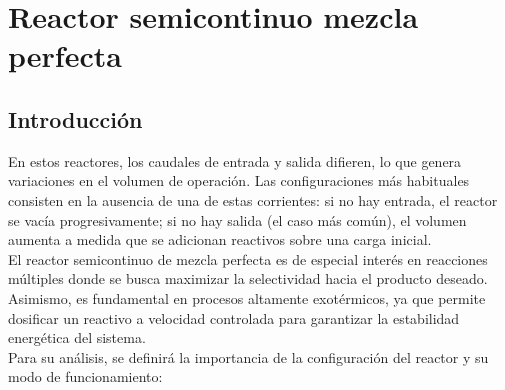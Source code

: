 \chapter{Reactor semicontinuo mezcla perfecta}
\section{Introducción}
\begin{flushleft}
  En estos reactores, los caudales de entrada y salida difieren, lo que genera variaciones en el volumen de operación. Las configuraciones más habituales consisten en la ausencia de una de estas corrientes: si no hay entrada, el reactor se vacía progresivamente; si no hay salida (el caso más común), el volumen aumenta a medida que se adicionan reactivos sobre una carga inicial.\\
  \vspace{1em}
  El reactor semicontinuo de mezcla perfecta es de especial interés en reacciones múltiples donde se busca maximizar la selectividad hacia el producto deseado. Asimismo, es fundamental en procesos altamente exotérmicos, ya que permite dosificar un reactivo a velocidad controlada para garantizar la estabilidad energética del sistema.\\
  \vspace{1em}
  Para su análisis, se definirá la importancia de la configuración del reactor y su modo de funcionamiento:
\end{flushleft}

